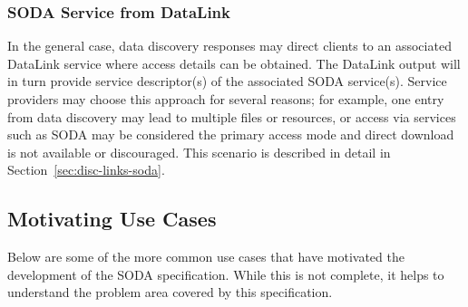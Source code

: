 \documentclass[11pt,a4paper]{ivoa}
\begin{document}
\subsubsection{SODA Service from DataLink}

In the general case, data discovery responses may direct clients to an
associated DataLink service where access details can be obtained. The
DataLink output will in turn provide service descriptor(s) of the
associated SODA service(s). Service providers may choose this approach
for several reasons; for example, one entry from data discovery may lead
to multiple files or resources, or access via services such as SODA may
be considered the primary access mode and direct download is not
available or discouraged. This scenario is described in detail in
Section~\ref{sec:disc-links-soda}.


\subsection{Motivating Use Cases}
Below are some of the more common use cases that have motivated the
development of the SODA specification. While this is not complete, it
helps to understand the problem area covered by this specification.
\end{document}
